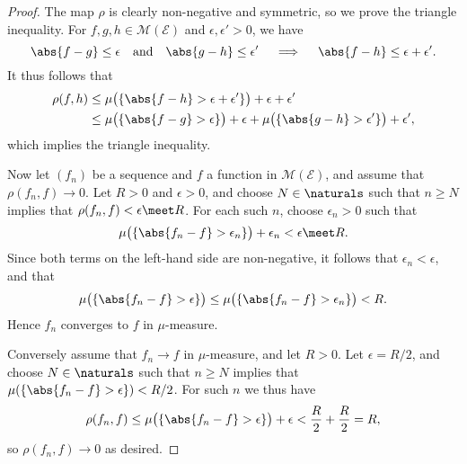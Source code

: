 \documentclass[article, a4paper, 11pt, oneside]{memoir}
\numberwithin{equation}{chapter}
\newcommand{\calE}{\mathcal{E}}
\newcommand{\measurable}{\mathcal{M}}
\begin{document}
\begin{proof}
    The map $\rho$ is clearly non-negative and symmetric, so we prove the triangle inequality. For $f,g,h \in \measurable(\calE)$ and $\epsilon, \epsilon' > 0$, we have
    \begin{equation*}
        \abs{f-g} \leq \epsilon
        \quad \text{and} \quad
        \abs{g-h} \leq \epsilon'
        \quad \implies \quad
        \abs{f-h} \leq \epsilon + \epsilon'.
    \end{equation*}
    It thus follows that
    \begin{align*}
        \rho(f,h)
            &\leq \mu\bigl( \{ \abs{f-h} > \epsilon + \epsilon' \}\bigr) + \epsilon + \epsilon' \\
            &\leq
                 \mu\bigl( \{ \abs{f-g} > \epsilon \}\bigr) + \epsilon
                +
                 \mu\bigl( \{ \abs{g-h} > \epsilon' \}\bigr)+ \epsilon',
    \end{align*}
    which implies the triangle inequality.

    Now let $(f_n)$ be a sequence and $f$ a function in $\measurable(\calE)$, and assume that $\rho(f_n,f) \to 0$. Let $R > 0$ and $\epsilon > 0$, and choose $N \in \naturals$ such that $n \geq N$ implies that $\rho(f_n,f) < \epsilon \meet R$. For each such $n$, choose $\epsilon_n > 0$ such that
    \begin{equation*}
        \mu\bigl( \{ \abs{f_n-f} > \epsilon_n \}\bigr) + \epsilon_n
            < \epsilon \meet R.
    \end{equation*}
    Since both terms on the left-hand side are non-negative, it follows that $\epsilon_n < \epsilon$, and that
    \begin{equation*}
        \mu\bigl( \{ \abs{f_n-f} > \epsilon \}\bigr)
            \leq \mu\bigl( \{ \abs{f_n-f} > \epsilon_n \}\bigr)
            < R.
    \end{equation*}
    Hence $f_n$ converges to $f$ in $\mu$-measure.

    Conversely assume that $f_n \to f$ in $\mu$-measure, and let $R > 0$. Let $\epsilon = R/2$, and choose $N \in \naturals$ such that $n \geq N$ implies that $\mu (\{ \abs{f_n-f} > \epsilon \}) < R/2$. For such $n$ we thus have
    \begin{equation*}
        \rho(f_n,f)
            \leq \mu\bigl( \{ \abs{f_n-f} > \epsilon \}\bigr) + \epsilon
            < \frac{R}{2} + \frac{R}{2}
            = R,
    \end{equation*}
    so $\rho(f_n,f) \to 0$ as desired.
\end{proof}
\end{document}
